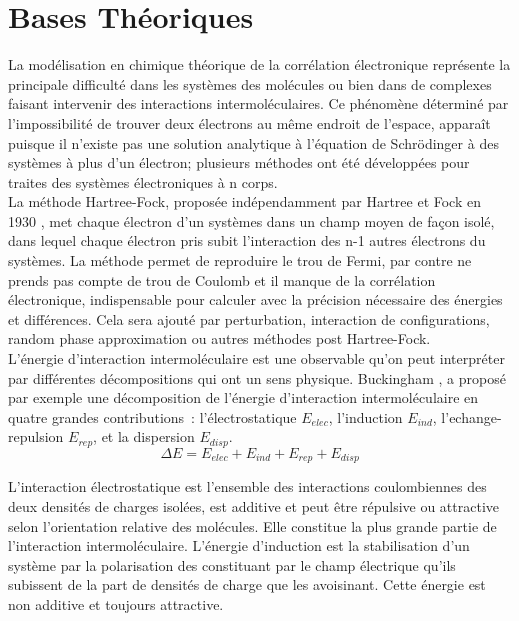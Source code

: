 \newpage

\section{Bases Théoriques}

La modélisation en chimique théorique de la corrélation électronique représente la principale difficulté dans les systèmes des molécules ou bien dans de complexes faisant intervenir des interactions intermoléculaires. Ce phénomène déterminé par l’impossibilité de trouver deux électrons au même endroit de l’espace, apparaît puisque il n’existe pas une solution analytique à l’équation de  Schrödinger à des systèmes à plus d’un électron; plusieurs méthodes ont été développées pour traites des systèmes électroniques à n corps.\\

La méthode Hartree-Fock, proposée indépendamment par Hartree et Fock en 1930 \cite{slater1930note}, met chaque électron d’un systèmes dans un champ moyen de façon isolé, dans lequel chaque électron pris subit l’interaction des n-1 autres électrons du systèmes. La méthode permet de reproduire le trou de Fermi, par contre ne prends pas compte de trou de Coulomb et il manque de la corrélation électronique, indispensable pour calculer avec la précision nécessaire des énergies et différences. Cela sera ajouté par perturbation, interaction de configurations, random phase approximation ou autres méthodes post Hartree-Fock.\\

L’énergie d’interaction intermoléculaire est une observable qu’on peut interpréter par différentes décompositions qui ont un sens physique. Buckingham \cite{buckingham1967permanent}, a proposé par exemple une décomposition de l’énergie d’interaction intermoléculaire en quatre grandes contributions : l’électrostatique $E_{elec}$, l’induction $E_{ind}$, l’echange-repulsion $E_{rep}$, et la dispersion $E_{disp}$.\\

\begin{equation}
\Delta E = E_{elec} + E_{ind} + E_{rep} + E_{disp}
\end{equation} 

L’interaction électrostatique est l’ensemble des interactions coulombiennes des deux densités de charges isolées, est additive et peut être répulsive ou attractive selon l’orientation relative des molécules. Elle constitue la plus grande partie de l’interaction intermoléculaire.  
L’énergie d’induction est la stabilisation d’un système par la polarisation des constituant par le champ électrique qu’ils subissent de la part de densités de charge que les avoisinant. Cette énergie est non additive et toujours attractive.\\

